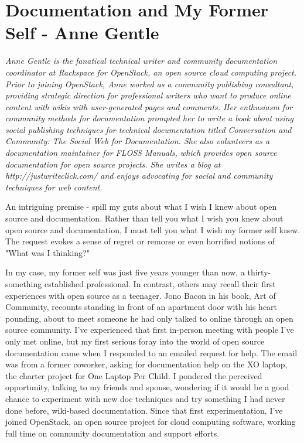 \chapter{Documentation and My Former Self - Anne Gentle}

\textit{Anne Gentle is the fanatical technical writer and community documentation coordinator at Rackspace for OpenStack, an open source cloud computing project. Prior to joining OpenStack, Anne worked as a community publishing consultant, providing strategic direction for professional writers who want to produce online content with wikis with user-generated pages and comments. Her enthusiasm for community methods for documentation prompted her to write a book about using social publishing techniques for technical documentation titled Conversation and Community: The Social Web for Documentation. She also volunteers as a documentation maintainer for FLOSS Manuals, which provides open source documentation for open source projects. She writes a blog at http://justwriteclick.com/ and enjoys advocating for social and community techniques for web content.}

An intriguing premise - spill my guts about what I wish I knew about open source and documentation. Rather than tell you what I wish you knew about open source and documentation, I must tell you what I wish my former self knew. The request evokes a sense of regret or remorse or even horrified notions of "What was I thinking?" 

In my case, my former self was just five years younger than now, a thirty-something established professional. In contrast, others may recall their first experiences with open source as a teenager. Jono Bacon in his book, Art of Community, recounts standing in front of an apartment door with his heart pounding, about to meet someone he had only talked to online through an open source community. I've experienced that first in-person meeting with people I've only met online, but my first serious foray into the world of open source documentation came when I responded to an emailed request for help. The email was from a former coworker, asking for documentation help on the XO laptop, the charter project for One Laptop Per Child. I pondered the perceived opportunity, talking to my friends and spouse, wondering if it would be a good chance to experiment with new doc techniques and try something I had never done before, wiki-based documentation. Since that first experimentation, I've joined OpenStack, an open source project for cloud computing software, working full time on community documentation and support efforts. 

